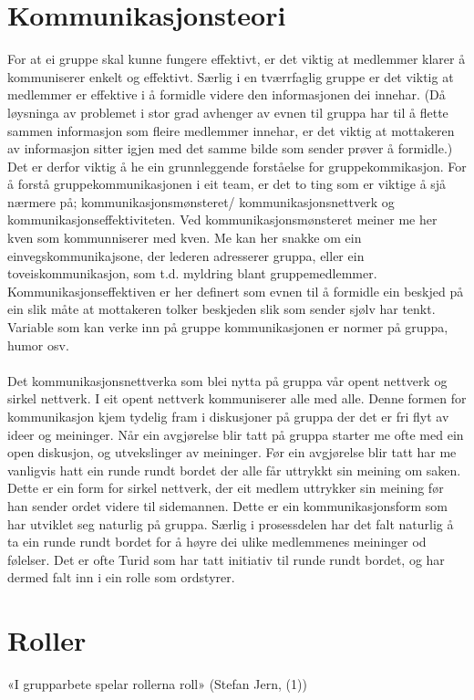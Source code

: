 \section{Kommunikasjonsteori}
%
%
For at ei gruppe skal kunne fungere effektivt, er det viktig at medlemmer klarer å kommuniserer enkelt og effektivt. Særlig i en tværrfaglig gruppe er det viktig at medlemmer er effektive i å formidle videre den informasjonen dei innehar. (Då løysninga av problemet i stor grad avhenger av evnen til gruppa har til å flette sammen informasjon som fleire medlemmer innehar, er det viktig at mottakeren av informasjon sitter igjen med det samme bilde som sender prøver å formidle.) Det er derfor viktig å he ein grunnleggende forståelse for gruppekommikasjon.
For å forstå gruppekommunikasjonen i eit team, er det to ting som er viktige å sjå nærmere på; kommunikasjonsmønsteret/ kommunikasjonsnettverk og kommunikasjonseffektiviteten. Ved kommunikasjonsmønsteret meiner me her kven som kommunniserer med kven. Me kan her snakke om ein einvegskommunikajsone, der lederen adresserer gruppa, eller ein toveiskommunikasjon, som t.d. myldring blant gruppemedlemmer. Kommunikasjonseffektiven er her definert som evnen til å formidle ein beskjed på ein slik måte at mottakeren tolker beskjeden slik som sender sjølv har tenkt.
Variable som kan verke inn på gruppe kommunikasjonen er normer på gruppa, humor osv.
\\
\\
Det kommunikasjonsnettverka som blei nytta på gruppa vår opent nettverk og sirkel nettverk. I eit opent nettverk kommuniserer alle med alle. Denne formen for kommunikasjon kjem tydelig fram i diskusjoner på gruppa der det er fri flyt av ideer og meininger. Når ein avgjørelse blir tatt på gruppa starter me ofte med ein open diskusjon, og utvekslinger av meininger. Før ein avgjørelse blir tatt har me vanligvis hatt ein runde rundt bordet der alle får uttrykkt sin meining om saken. Dette er ein form for sirkel nettverk, der eit medlem uttrykker sin meining før han sender ordet videre til sidemannen. Dette er ein kommunikasjonsform som har utviklet seg naturlig på gruppa. Særlig i prosessdelen har det falt naturlig å ta ein runde rundt bordet for å høyre dei ulike medlemmenes meininger od følelser. Det er ofte Turid som har tatt initiativ til runde rundt bordet, og har dermed falt inn i ein rolle som ordstyrer. 
\\
\section{Roller}
«I grupparbete spelar rollerna roll» (Stefan Jern, (1))\\


